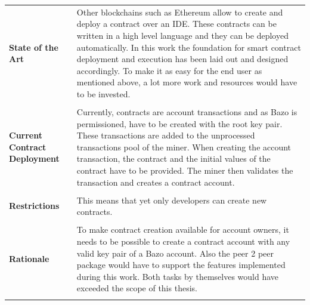 \begin{tabular}[t]{ p{3cm} p{12.5cm}}
\raggedright
\textbf{State of the Art} &
Other blockchains such as Ethereum allow to create and deploy a contract over an IDE. These contracts can be written in a high level language and they can be deployed automatically. In this work the foundation for smart contract deployment and execution has been laid out and designed accordingly. To make it as easy for the end user as mentioned above, a lot more work and resources would have to be invested. \\ \\

\raggedright
\textbf{Current Contract Deployment} &
Currently, contracts are account transactions and as Bazo is permissioned, have to be created with the root key pair. These transactions are added to the unprocessed transactions pool of the miner. When creating the account transaction, the contract and the initial values of the contract have to be provided. The miner then validates the transaction and creates a contract account. \\ \\

\raggedright
\textbf{Restrictions} &
This means that yet only developers can create new contracts. \\ \\

\raggedright
\textbf{Rationale} &
To make contract creation available for account owners, it needs to be possible to create a contract account with any valid key pair of a Bazo account. Also the peer 2 peer package would have to support the features implemented during this work.
Both tasks by themselves would have exceeded the scope of this thesis. \\ \\
\end{tabular}

